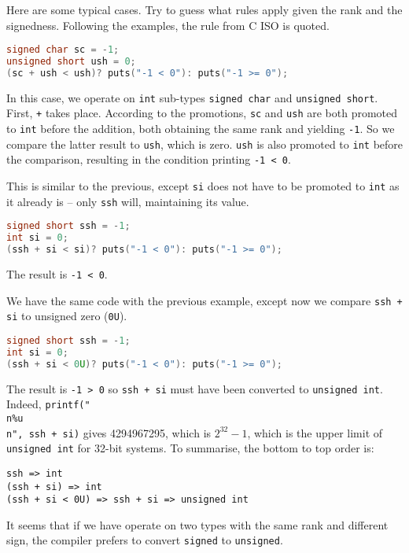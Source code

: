 Here are some typical cases. Try to guess what rules apply given the rank and the signedness. Following the examples, the rule from C ISO is quoted. 

\begin{exmp}
\begin{lstlisting}[language=c]
signed char sc = -1;
unsigned short ush = 0;
(sc + ush < ush)? puts("-1 < 0"): puts("-1 >= 0");
\end{lstlisting}
In this case, we operate on \texttt{int} sub-types \texttt{signed char} and \texttt{unsigned short}. First, \texttt{+} takes place. According to the promotions, \texttt{sc} and \texttt{ush} are both promoted to \texttt{int} before the addition, both obtaining the same rank and yielding \texttt{-1}. So we compare the latter result to \texttt{ush}, which is zero. \texttt{ush} is also promoted to \texttt{int} before the comparison, resulting in the condition printing  \texttt{-1 < 0}. \qedblack
\end{exmp}


\begin{exmp}
This is similar to the previous, except \texttt{si} does not have to be promoted to \texttt{int} as it already is -- only \texttt{ssh} will, maintaining its value.
\begin{lstlisting}[language=c]
signed short ssh = -1;
int si = 0;
(ssh + si < si)? puts("-1 < 0"): puts("-1 >= 0");
\end{lstlisting}
The result is \texttt{-1 < 0}.
\end{exmp}


\begin{exmp}

We have the same code with the previous example, except now we compare \texttt{ssh + si} to unsigned zero (\texttt{0U}).
\begin{lstlisting}[language=c]
signed short ssh = -1;
int si = 0;
(ssh + si < 0U)? puts("-1 < 0"): puts("-1 >= 0");
\end{lstlisting}
The result is \texttt{-1 > 0} so \texttt{ssh + si} must have been converted to \texttt{unsigned int}. Indeed, \texttt{printf("\\n\%u\\n", ssh + si)} gives 4294967295, which is $2^{32}-1$, which is the upper limit of \texttt{unsigned int} for 32-bit systems. To summarise, the bottom to top order is:
\begin{verbatim}
ssh => int
(ssh + si) => int
(ssh + si < 0U) => ssh + si => unsigned int
\end{verbatim}
It seems that if we have operate on two types with the same rank and different sign, the compiler prefers to convert \texttt{signed} to \texttt{unsigned}. \qedblack
\end{exmp}


